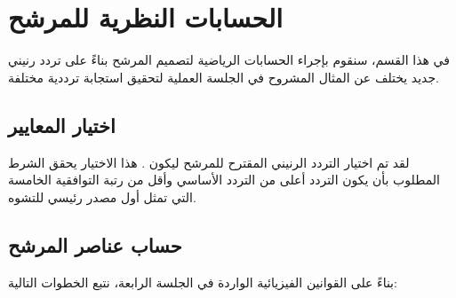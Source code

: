 
\section{الحسابات النظرية للمرشح} \label{part2:sec2}

{\fontsize{16}{27}\selectfont
في هذا القسم، سنقوم بإجراء الحسابات الرياضية لتصميم المرشح بناءً على تردد رنيني جديد يختلف عن المثال المشروح في الجلسة العملية  لتحقيق استجابة ترددية مختلفة.
\par}

\subsection{اختيار المعايير}

لقد تم اختيار التردد الرنيني المقترح للمرشح ليكون . هذا الاختيار يحقق الشرط المطلوب بأن يكون التردد أعلى من التردد الأساسي  وأقل من رتبة التوافقية الخامسة  التي تمثل أول مصدر رئيسي للتشوه.

\subsection{حساب عناصر المرشح }

بناءً على القوانين الفيزيائية الواردة في الجلسة الرابعة، نتبع الخطوات التالية:

